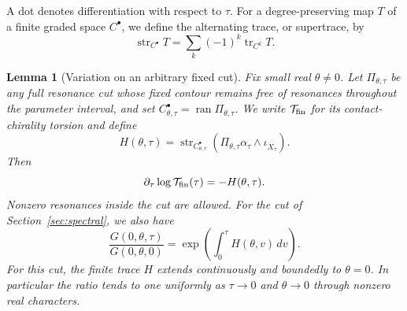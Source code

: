 \documentclass[11pt,letterpaper,reqno]{amsart}
\newtheorem{lemma}[theorem]{Lemma}
\theoremstyle{remark}
\newcommand{\tr}{\operatorname{tr}}
\newcommand{\str}{\operatorname{str}}
\newcommand{\ran}{\operatorname{ran}}
\begin{document}
A dot denotes differentiation with respect to $\tau$. For a
degree-preserving map $T$ of a finite graded space $C^\bullet$, we define
the alternating trace, or supertrace, by
\[
 \str_{C^\bullet}T=\sum_k(-1)^k\tr_{C^k}T.
\]
\begin{lemma}[Variation on an arbitrary fixed cut]\label{cutvariation}
Fix small real $\theta\ne0$. Let $\Pi_{\theta,\tau}$ be any full
resonance cut whose fixed contour remains free of resonances throughout
the parameter interval, and set $C^\bullet_{\theta,\tau}=\ran\Pi_{\theta,\tau}$.
We write $\mathcal T_{\rm fin}$ for its contact-chirality torsion
\cite[Section~3.3]{CD} and define
\[
 H(\theta,\tau)=\str_{C^\bullet_{\theta,\tau}}
       (\Pi_{\theta,\tau}\alpha_\tau\wedge\iota_{\dot X_\tau}).
\]
Then
\[
 \partial_\tau\log\mathcal T_{\rm fin}(\tau)=-H(\theta,\tau).
\]
Nonzero resonances inside the cut are allowed.
For the cut of Section~\ref{sec:spectral}, we also have
\begin{equation}\label{Gvariation}
 \frac{G(0,\theta,\tau)}{G(0,\theta,0)}
 =\exp\left(\int_0^\tau H(\theta,v)\,dv\right).
\end{equation}
For this cut, the finite trace $H$ extends continuously and boundedly
to $\theta=0$. In particular the ratio tends to one uniformly as
$\tau\to0$ and $\theta\to0$ through nonzero real characters.
\end{lemma}
\end{document}
